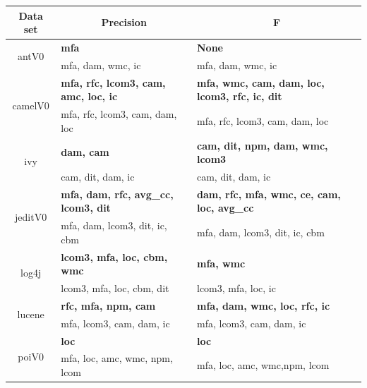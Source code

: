 \documentclass{sig-alternative}
\begin{document}







\begin{table}[!ht]

\renewcommand{\baselinestretch}{0.8}
\scriptsize
\centering
  \begin{tabular}{c|p{1in}|p{1in}}
    \multicolumn{1}{c|}{ Data set}  &   \multicolumn{1}{c|}{Precision} & \multicolumn{1}{c}{F} \\ \hline 
 \multirow{2}{*}{antV0} & {\bf mfa} &  {\bf None} \\
         & mfa, dam, wmc, ic & mfa, dam, wmc, ic\\
  \hline
 \multirow{2}{*}{camelV0} & {\bf mfa, rfc, lcom3, cam, amc, loc, ic} &{\bf  mfa, wmc, cam, dam, loc, lcom3, rfc, ic, dit }\\
        & mfa, rfc, lcom3, cam, dam, loc & mfa, rfc, lcom3, cam, dam, loc\\
  \hline
 \multirow{2}{*}{ivy} & {\bf dam, cam} &{\bf  cam, dit, npm, dam, wmc, lcom3 }  \\
       & cam, dit, dam, ic & cam, dit, dam, ic \\
  \hline
 \multirow{2}{*}{jeditV0} &{\bf  mfa, dam, rfc, avg\_cc, lcom3, dit }&{\bf  dam, rfc, mfa, wmc, ce, cam, loc, avg\_cc}\\
         & mfa, dam, lcom3, dit, ic, cbm & mfa, dam, lcom3, dit, ic, cbm \\
  \hline
 \multirow{2}{*}{log4j} & {\bf lcom3, mfa, loc, cbm, wmc }&{\bf  mfa, wmc}\\
         & lcom3, mfa, loc, cbm, dit & lcom3, mfa, loc, ic \\
   \hline
  \multirow{2}{*}{lucene} & {\bf rfc, mfa, npm, cam} & {\bf mfa, dam, wmc, loc, rfc, ic}\\
         & mfa, lcom3, cam, dam, ic & mfa, lcom3, cam, dam, ic\\
   \hline
   \multirow{2}{*}{poiV0} & {\bf loc }& {\bf loc} \\
        & mfa, loc, amc, wmc, npm, lcom & mfa, loc, amc, wmc,npm, lcom\\

\end{tabular}
\end{table}
\end{document}
